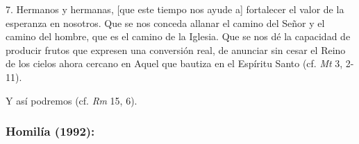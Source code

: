 \begin{body}
					7. Hermanos y hermanas, {[}que este tiempo nos ayude a{]} fortalecer el valor de la esperanza en nosotros. Que se nos conceda allanar el camino del Señor y el camino del hombre, que es el camino de la Iglesia. Que se nos dé la capacidad de producir frutos que expresen una conversión real, de anunciar sin cesar el Reino de los cielos ahora cercano en Aquel que bautiza en el Espíritu Santo (cf. \emph{Mt} 3, 2-11). 
					
					Y así podremos  (cf. \emph{Rm} 15, 6).
				\end{body}
			
			\subsubsection{Homilía (1992):}
			
			
